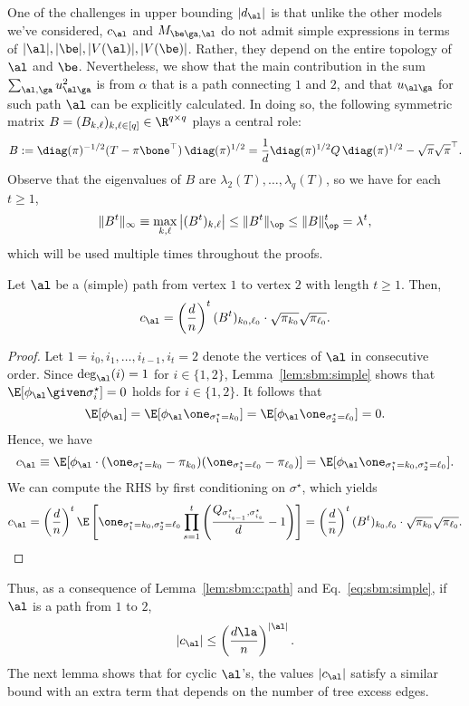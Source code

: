 \documentclass[11pt]{article}
\begin{document}
One of the challenges in upper bounding $|d_{\al}|$ is that unlike the other models we've considered, $c_{\al}$ and $M_{\be\ga,\al}$ do not admit simple expressions in terms of $|\al|, |\be|, |V(\al)|, |V(\be)|$. Rather, they depend on the entire topology of $\al$ and $\be$. Nevertheless, we show that the main contribution in the sum $\sum_{\al,\ga}u_{\al\ga}^2$ is from $\alpha$ that is a path connecting $1$ and $2$, and that $u_{\al\ga}$ for such path $\al$ can be explicitly calculated. In doing so, the following symmetric matrix $B=(B_{k,\ell})_{k,\ell \in [q]} \in \R^{q\times q}$ plays a central role:
\[
B:=\diag(\pi)^{-1/2}(T-\pi\bone^\top) \, \diag(\pi)^{1/2}=\frac{1}{d}\diag(\pi)^{1/2}Q \, \diag(\pi)^{1/2}-\sqrt{\pi}\sqrt{\pi}^\top.
\]
Observe that the eigenvalues of $B$ are $\lambda_2(T),\ldots, \lambda_q(T)$, so we have for each $t\geq 1$,
\begin{equation}\label{eq:sbm:simple}
\|B^t\|_{\infty}\equiv \max_{k,\ell}\big|(B^t)_{k,\ell}\big|\leq \|B^t\|_{\op}\leq \|B\|_{\op}^t=\lambda^t,
\end{equation}
which will be used multiple times throughout the proofs.
\begin{lemma}\label{lem:sbm:c:path}
    Let $\al$ be a (simple) path from vertex $1$ to vertex $2$ with length $t\geq 1$. Then,
    \[
    c_{\al}=\left(\frac{d}{n}\right)^{t}(B^t)_{k_0,\ell_0}\cdot \sqrt{\pi_{k_0}}\sqrt{\pi_{\ell_0}}.
    \]
\end{lemma}
\begin{proof}
Let $1=i_0,i_1,\ldots, i_{t-1},i_t=2$ denote the vertices of $\al$ in consecutive order. Since $\deg_{\al}(i)=1$ for $i\in \{1,2\}$, Lemma~\ref{lem:sbm:simple} shows that $\E[\phi_{\al}\given \sigma^\star_i]=0$ holds for $i\in \{1,2\}$. It follows that
   \[
   \E[\phi_{\al}]=\E[\phi_{\al}\one_{\sigma^\star_{1}=k_0}]=\E[\phi_{\al}\one_{\sigma^\star_{2}=\ell_0}]=0.
   \]
   Hence, we have
   \[
   c_{\al}\equiv \E[\phi_{\al} \cdot(\one_{\sigma^\star_1=k_0}-\pi_{k_0})(\one_{\sigma^\star_1=\ell_0}-\pi_{\ell_0})]=\E[\phi_{\al}\one_{\sigma^\star_1=k_0,\sigma^\star_2=\ell_0}].
   \]
   We can compute the RHS by first conditioning on $\sigma^\star$, which yields
   \[
   c_{\al}=\left(\frac{d}{n}\right)^{t}\E\left[\one_{\sigma^\star_1=k_0,\sigma^\star_2=\ell_0}\prod_{s=1}^{t} \left(\frac{Q_{\sigma^\star_{i_{s-1}}, \sigma^\star_{i_{s}}}}{d}-1\right)\right]=\left(\frac{d}{n}\right)^{t}(B^t)_{k_0,\ell_0}\cdot \sqrt{\pi_{k_0}}\sqrt{\pi_{\ell_0}}.
   \]
\end{proof}

Thus, as a consequence of Lemma~\ref{lem:sbm:c:path} and Eq.~\eqref{eq:sbm:simple}, if $\al$ is a path from $1$ to $2$,
\[
|c_{\al}|\leq \left(\frac{d\la}{n}\right)^{|\al|}.
\]
The next lemma shows that for cyclic $\al$'s, the values $|c_{\al}|$ satisfy a similar bound with an extra term that depends on the number of tree excess edges.
\end{document}
